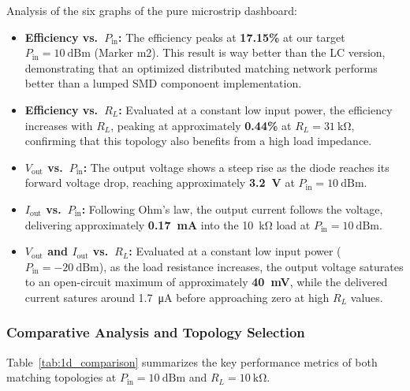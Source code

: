 Analysis of the six graphs of the pure microstrip dashboard:
\begin{itemize}
    \item \textbf{Efficiency vs.\ $P_\mathrm{in}$:}
    The efficiency peaks at \textbf{17.15\%} at our target
    $P_\mathrm{in} = \SI{10}{\text{dBm}}$ (Marker m2).
    This result is way better than the
    LC version, demonstrating that an
    optimized distributed matching network performs better than a
    lumped SMD componoent implementation.

    \item \textbf{Efficiency vs.\ $R_L$:}
    Evaluated at a constant low input power, the efficiency increases with $R_L$, peaking at approximately \textbf{0.44\%}
    at $R_L = \SI{31}{\kilo\ohm}$, confirming that this topology also
    benefits from a high load impedance.

    \item \textbf{$V_\mathrm{out}$ vs.\ $P_\mathrm{in}$:}
    The output voltage shows a steep rise as the diode
    reaches its forward voltage drop, reaching approximately
    \textbf{\SI{3.2}{\volt}} at $P_\mathrm{in} = \SI{10}{\text{dBm}}$.

    \item \textbf{$I_\mathrm{out}$ vs.\ $P_\mathrm{in}$:}
    Following Ohm's law, the output current follows the voltage,
    delivering approximately \textbf{\SI{0.17}{\milli\ampere}} into
    the \SI{10}{\kilo\ohm} load at $P_\mathrm{in} = \SI{10}{\text{dBm}}$.

    \item \textbf{$V_\mathrm{out}$ and $I_\mathrm{out}$ vs.\ $R_L$:}
    Evaluated at a constant low input power
    ($P_\mathrm{in} = -\SI{20}{\text{dBm}}$), as the load resistance
    increases, the output voltage saturates to an open-circuit
    maximum of approximately \textbf{\SI{40}{\milli\volt}}, while the
    delivered current satures around \SI{1.7}{\micro\ampere} before
    approaching zero at high $R_L$ values.
\end{itemize}

\subsubsection{Comparative Analysis and Topology Selection}

Table~\ref{tab:1d_comparison} summarizes the key performance metrics
of both matching topologies at $P_\mathrm{in} = \SI{10}{\text{dBm}}$
and $R_L = \SI{10}{\kilo\ohm}$.

